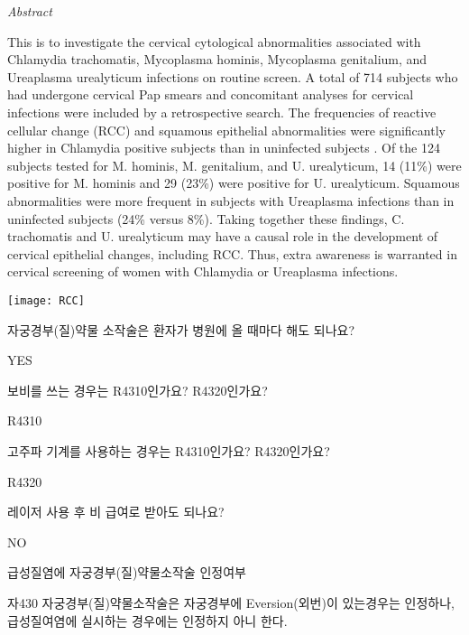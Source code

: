 {\emph{Abstract}\par

This is to investigate the cervical cytological abnormalities associated with Chlamydia trachomatis, Mycoplasma hominis, Mycoplasma genitalium, and Ureaplasma urealyticum infections on routine screen. A total of 714 subjects who had undergone cervical Pap smears and concomitant analyses for cervical infections were included by a retrospective search. The frequencies of reactive cellular change (RCC) and squamous epithelial abnormalities were significantly higher in Chlamydia positive subjects than in uninfected subjects . Of the 124 subjects tested for M. hominis, M. genitalium, and U. urealyticum, 14 (11\%) were positive for M. hominis and 29 (23\%) were positive for U. urealyticum. Squamous abnormalities were more frequent in subjects with Ureaplasma infections than in uninfected subjects (24\% versus 8\%). Taking together these findings, C. trachomatis and U. urealyticum may have a causal role in the development of cervical epithelial changes, including RCC. Thus, extra awareness is warranted in cervical screening of women with Chlamydia or Ureaplasma infections.
}

\texttt{[image: RCC]}

자궁경부(질)약물 소작술은 환자가 병원에 올 때마다 해도 되나요?
\begin{quotebox}
YES
\end{quotebox}

보비를 쓰는 경우는 R4310인가요? R4320인가요?
\begin{quotebox}
R4310
\end{quotebox} 
고주파 기계를 사용하는 경우는 R4310인가요? R4320인가요?
\begin{quotebox}
R4320
\end{quotebox}
레이저 사용 후 비 급여로 받아도 되나요?
\begin{quotebox}
NO
\end{quotebox}
급성질염에 자궁경부(질)약물소작술 인정여부
\begin{quotebox}
자430 자궁경부(질)약물소작술은 자궁경부에 Eversion(외번)이 있는경우는 인정하나, 급성질여염에 실시하는 경우에는 인정하지 아니 한다.
\end{quotebox}
